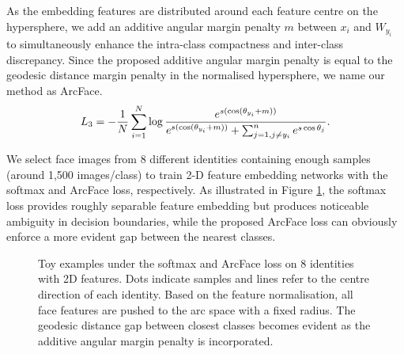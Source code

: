 \documentclass[10pt,twocolumn,letterpaper]{article}
\begin{document}
As the embedding features are distributed around each feature centre on the hypersphere, we add an additive angular margin penalty $m$ between $x_i$ and $W_{y_i}$ to simultaneously enhance the intra-class compactness and inter-class discrepancy. Since the proposed additive angular margin penalty is equal to the geodesic distance margin penalty in the normalised hypersphere, we name our method as ArcFace. 
\begin{equation}
{L_3}=-\frac{1}{N}\sum_{i=1}^{N}\log\frac{e^{s(\cos(\theta_{y_i}+m))}}{e^{s(\cos(\theta_{y_i}+m))}+\sum_{j=1,j\neq  y_i}^{n}e^{s\cos\theta_{j}}}.
\label{eq:arcface}
\vspace{-1mm}
\end{equation}

We select face images from 8 different identities containing enough samples (around 1,500 images/class) to train 2-D feature embedding networks with the softmax and ArcFace loss, respectively. As illustrated in Figure \ref{fig:compactness}, the softmax loss provides roughly separable feature embedding but produces noticeable ambiguity in decision boundaries, while the proposed ArcFace loss can obviously enforce a more evident gap between the nearest classes. 

\begin{figure}[h!]
\centering
{}
\caption{Toy examples under the softmax and ArcFace loss on 8 identities with 2D features. Dots indicate samples and lines refer to the centre direction of each identity. Based on the feature normalisation, all face features are pushed to the arc space with a fixed radius. The geodesic distance gap between closest classes becomes evident as the additive angular margin penalty is incorporated.}
\vspace{-6mm}
\label{fig:compactness}
\end{figure}
\end{document}
